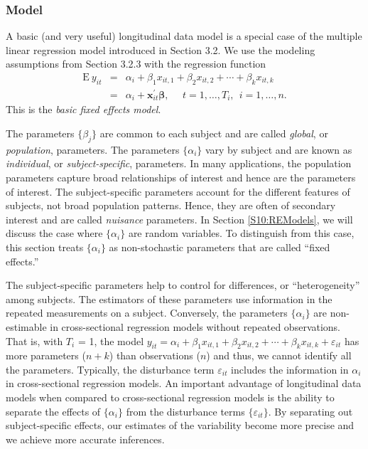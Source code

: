 \subsubsection*{Model}

A basic (and very useful) longitudinal data model is a special case
of the multiple linear regression model introduced in Section 3.2.
We use the modeling assumptions from Section 3.2.3 with the
regression function
\begin{eqnarray}\label{E10:BasicFEModel}
\mathrm{E}~y_{it} & = & \alpha_i + \beta_1 x_{it,1} + \beta_2
x_{it,2} + \cdots + \beta_k x_{it,k} \nonumber\\
& = & \alpha_i + \mathbf{x}_{it}^{\prime} \boldsymbol \beta,~~~~~~
t=1, \ldots, T_i,~~ i=1, \ldots, n .
\end{eqnarray}
This is the \textit{basic fixed effects model}.

The parameters $\{\beta_j\}$ are common to each subject and are
called \emph{global}, or \emph{population}, parameters. The
parameters $\{\alpha_i\}$ vary by subject and are known as
\textit{individual}, or \textit{subject-specific}, parameters. In
many applications, the population parameters capture broad
relationships of interest and hence are the parameters of interest.
The subject-specific parameters account for the different features
of subjects, not broad population patterns. Hence, they are often of
secondary interest and are called \emph{nuisance} parameters. In
Section \ref{S10:REModels}, we will discuss the case where
$\{\alpha_i\}$ are random variables. To distinguish from this case,
this section treats $\{\alpha_i\}$  as non-stochastic parameters
that are called ``fixed effects.''

The subject-specific parameters help to control for differences, or
``heterogeneity'' among subjects. The estimators of these parameters
use information in the repeated measurements on a subject.
Conversely, the parameters $\{\alpha_i\}$ are non-estimable in
cross-sectional regression models without repeated observations.
That is, with $T_i$ = 1, the model $y_{it}  =  \alpha_i + \beta_1
x_{it,1} + \beta_2 x_{it,2} + \cdots + \beta_k x_{it,k} +
\varepsilon_{it}$ has more parameters ($n+k$) than observations
($n$) and thus, we cannot identify all the parameters. Typically,
the disturbance term $\varepsilon_{it}$ includes the information in
$\alpha_i$ in cross-sectional regression models. An important
advantage of longitudinal data models when compared to
cross-sectional regression models is the ability to separate the
effects of  $\{\alpha_i\}$ from the disturbance terms
$\{\varepsilon_{it}\}$. By separating out subject-specific effects,
our estimates of the variability become more precise and we achieve
more accurate inferences.


